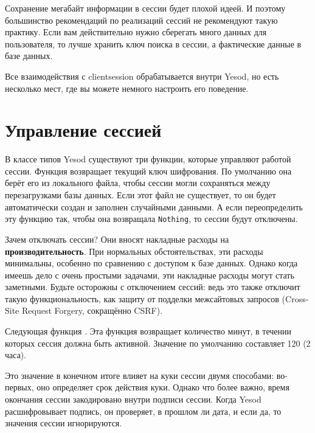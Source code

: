 Сохранение мегабайт информации в сессии будет плохой идеей. И поэтому большинство рекомендаций по реализаций сессий не рекомендуют такую практику. Если вам действительно нужно сберегать много данных для пользователя, то лучше хранить ключ поиска в сессии, а фактические данные в базе данных.

Все взаимодействия с clientsession обрабатывается внутри Yesod, но есть несколько мест, где вы можете немного настроить его поведение.

\section{Управление сессией}

В классе типов Yesod существуют три функции, которые управляют работой сессии. Функция  возвращает текущий ключ шифрования. По умолчанию она берёт его из локального файла, чтобы сессии могли сохраняться между перезагрузками базы данных. Если этот файл не существует, то он будет автоматически создан и заполнен случайными данными. А если переопределить эту функцию так, чтобы она возвращала \lstinline'Nothing', то сессии будут отключены.

\begin{remark}
Зачем отключать сессии? Они вносят накладные расходы на \textbf{производительность}. При нормальных обстоятельствах, эти расходы минимальны, особенно по сравнению с доступом к базе данных. Однако когда имеешь дело с очень простыми задачами, эти накладные расходы могут стать заметными. Будьте осторожны с отключением сессий: ведь это также отключит такую функциональность, как защиту от подделки межсайтовых запросов (Cross-Site Request Forgery, сокращённо CSRF).
\end{remark}

Следующая функция . Эта функция возвращает количество минут, в течении которых сессия должна быть активной. Значение по умолчанию составляет 120 (2 часа).

Это значение в конечном итоге влияет на куки сессии двумя способами: во-первых, оно определяет срок действия куки. Однако что более важно, время окончания сессии закодировано внутри подписи сессии. Когда Yesod расшифровывает подпись, он проверяет, в прошлом ли дата, и если да, то значения сессии игнорируются.

